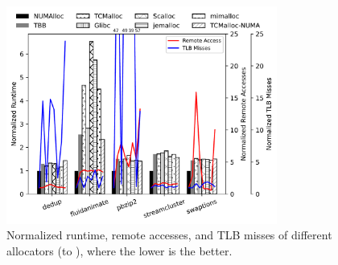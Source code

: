 \begin{figure}[!h]
    \centering 
    \includegraphics[width=3.5in]{SC2022/figure/remote access.pdf}
    \caption{Normalized runtime, remote accesses, and TLB misses of different allocators (to \NM{}), where the lower is the better. }
    \label{fig:remoteAccess}
\end{figure}


